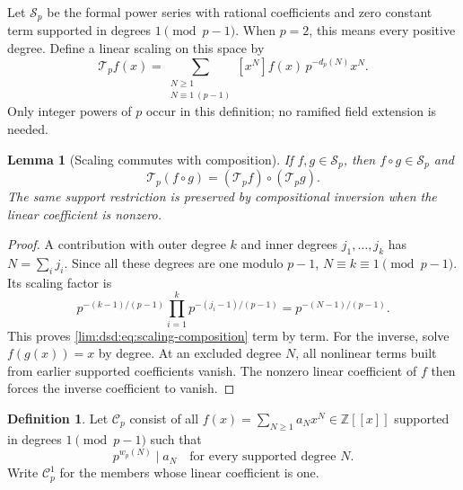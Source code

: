 \documentclass[11pt]{article}
\newtheorem{lemma}[theorem]{Lemma}
\theoremstyle{definition}
\newtheorem{definition}[theorem]{Definition}
\theoremstyle{remark}
\newcommand{\Z}{\mathbb Z}
\newcommand{\N}{\mathbb N}
\newcommand{\Cp}{\mathcal C_p}
\newcommand{\Tp}{\mathcal T_p}
\begin{document}
Let $\mathscr S_p$ be the formal power series with rational coefficients and zero constant term
supported in degrees $1\pmod{p-1}$. When $p=2$, this means every positive
degree. Define a linear scaling on this space by
\begin{equation}
 \Tp f(x)=\sum_{\substack{N\ge1\\N\equiv1\ (p-1)}}
    [x^N]f(x)\,p^{-d_p(N)}x^N.
 \label{lim:dsd:eq:scaling}
\end{equation}
Only integer powers of $p$ occur in this definition; no ramified field
extension is needed.

\begin{lemma}[Scaling commutes with composition]
\label{lim:dsd:lem:scaling}
If $f,g\in\mathscr S_p$, then $f\circ g\in\mathscr S_p$ and
\begin{equation}
 \Tp(f\circ g)=(\Tp f)\circ(\Tp g).
 \label{lim:dsd:eq:scaling-composition}
\end{equation}
The same support restriction is preserved by compositional inversion
when the linear coefficient is nonzero.
\end{lemma}
\begin{proof}
A contribution with outer degree $k$ and inner degrees
$j_1,\ldots,j_k$ has $N=\sum_i j_i$. Since all these degrees are one
modulo $p-1$, $N\equiv k\equiv1\pmod{p-1}$. Its scaling factor is
\[
 p^{-(k-1)/(p-1)}\prod_{i=1}^k p^{-(j_i-1)/(p-1)}
 =p^{-(N-1)/(p-1)}.
\]
This proves \eqref{lim:dsd:eq:scaling-composition} term by term. For the inverse,
solve $f(g(x))=x$ by degree. At an excluded degree $N$, all nonlinear
terms built from earlier supported coefficients vanish. The nonzero
linear coefficient of $f$ then forces the inverse coefficient to vanish.
\end{proof}

\begin{definition}
Let $\Cp$ consist of all $f(x)=\sum_{N\ge1}a_Nx^N\in\Z[[x]]$
supported in degrees $1\pmod{p-1}$ such that
\begin{equation}
 p^{w_p(N)}\mid a_N
 \quad\text{for every supported degree }N.
 \label{lim:dsd:eq:class-definition}
\end{equation}
Write $\Cp^1$ for the members whose linear coefficient is one.
\end{definition}
\end{document}
